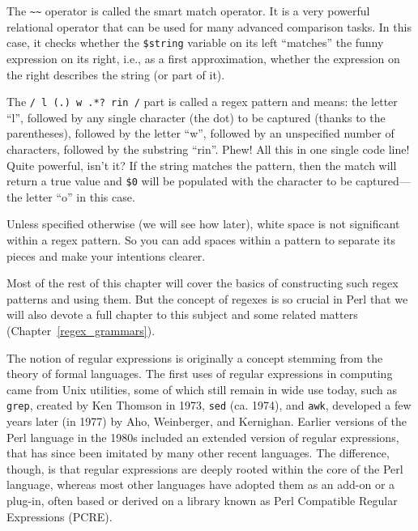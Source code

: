 The \verb'~~' operator is called the smart match operator. It is 
a very powerful relational operator that can be used for 
many advanced comparison tasks. In this case, it checks whether 
the {\tt \$string} variable on its left ``matches''  
the funny expression on its right, i.e., as a first 
approximation, whether the expression on the right describes 
the string (or part of it). 

The \verb'/ l (.) w .*? rin /' part is called a regex pattern and means: 
the letter ``l'', followed by any single character (the dot) to be 
captured (thanks to the parentheses), followed by the letter ``w'', 
followed by an unspecified number of characters, followed by the 
substring ``rin''. Phew! All this in one single code line! Quite 
powerful, isn't it? If the string matches the pattern, then 
the match will return a true value and \verb'$0' will be 
populated with the character to be captured---the letter ``o'' 
in this case.

Unless specified otherwise (we will see how later), white space 
is not significant within a regex pattern. So you can add spaces 
within a pattern to separate its pieces and make your 
intentions clearer.

Most of the rest of this chapter will cover the basics of constructing 
such regex patterns and using them. But the concept of 
regexes is so crucial in Perl that we will also devote a full 
chapter to this subject and some related matters (Chapter~\ref{regex_grammars}).

The notion of regular expressions is originally a concept 
stemming from the theory of formal languages. The first 
uses of regular expressions in computing came from 
Unix utilities, some of which still remain in wide use today, such as 
{\tt grep}, created by Ken Thomson in 1973, {\tt sed} (ca. 1974), and 
{\tt awk}, developed a few years later (in 1977) by Aho, Weinberger, and Kernighan. 
Earlier versions of the Perl language in the 1980s included an 
extended version of regular expressions, that has since 
been imitated by many other recent languages. The difference, 
though, is that regular expressions are deeply rooted within the 
core of the Perl language, whereas most other languages have 
adopted them as an add-on or a plug-in, often based or derived 
on a library known as Perl Compatible Regular Expressions (PCRE).

